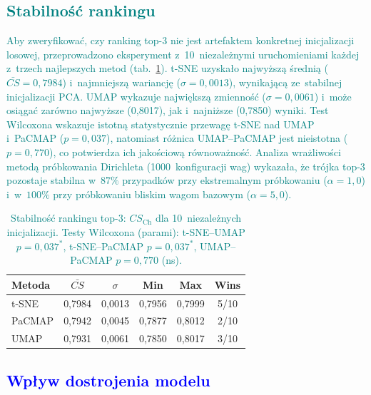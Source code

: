 \documentclass[a4paper,11pt,twocolumn]{article}
\newcommand{\hl}[1]{\textcolor{blue}{#1}}
\newcommand{\hlme}[1]{\textcolor{teal}{#1}}
\begin{document}
\subsection{\hlme{Stabilność rankingu}}

\hlme{Aby zweryfikować, czy ranking top-3 nie jest artefaktem
konkretnej inicjalizacji losowej, przeprowadzono eksperyment
z~10~niezależnymi uruchomieniami każdej z~trzech najlepszych metod
(tab.~\ref{tab:stability}).
t-SNE uzyskało najwyższą średnią ($\bar{CS}=0{,}7984$) i~najmniejszą
wariancję ($\sigma=0{,}0013$), wynikającą ze~stabilnej inicjalizacji PCA.
UMAP wykazuje największą zmienność ($\sigma=0{,}0061$) i~może osiągać
zarówno najwyższe (0,8017), jak i~najniższe (0,7850) wyniki.
Test Wilcoxona wskazuje istotną statystycznie przewagę t-SNE
nad UMAP i~PaCMAP ($p=0{,}037$), natomiast różnica UMAP--PaCMAP
jest nieistotna ($p=0{,}770$), co potwierdza ich jakościową
równoważność. Analiza wrażliwości metodą próbkowania Dirichleta
(1000~konfiguracji wag) wykazała, że trójka top-3 pozostaje
stabilna w~$87\%$ przypadków przy ekstremalnym próbkowaniu ($\alpha=1{,}0$)
i~w~$100\%$ przy próbkowaniu bliskim wagom bazowym ($\alpha=5{,}0$).}

\begin{table}[ht]
\centering
\caption{\hlme{Stabilność rankingu top-3: $CS_\text{Ch}$ dla
10~niezależnych inicjalizacji. Testy Wilcoxona (parami):
t-SNE--UMAP $p=0{,}037^{*}$, t-SNE--PaCMAP $p=0{,}037^{*}$,
UMAP--PaCMAP $p=0{,}770$ (ns).}}
\label{tab:stability}
\small
\begin{tabular}{@{}lccccc@{}}
\toprule
Metoda & $\bar{CS}$ & $\sigma$ & Min & Max & Wins \\
\midrule
t-SNE  & 0,7984 & 0,0013 & 0,7956 & 0,7999 & 5/10 \\
PaCMAP & 0,7942 & 0,0045 & 0,7877 & 0,8012 & 2/10 \\
UMAP   & 0,7931 & 0,0061 & 0,7850 & 0,8017 & 3/10 \\
\bottomrule
\end{tabular}
\end{table}


\subsection{\hl{Wpływ dostrojenia modelu}}
\end{document}
